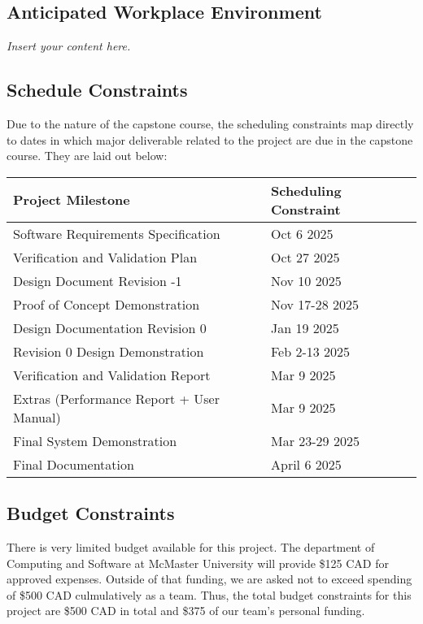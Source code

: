 \documentclass[12pt]{article}
\newcommand{\lips}{\textit{Insert your content here.}}
\begin{document}
\subsection{Anticipated Workplace Environment}
\lips
\subsection{Schedule Constraints}

\par{Due to the nature of the capstone course, the scheduling constraints
map directly to dates in which major deliverable related to the project are due in the capstone course.
They are laid out below:}

\begin{tabular}{|m{5cm}|m{10cm}|}
    \hline
    Project Milestone & Scheduling Constraint\\
    \hline
    Software Requirements Specification & Oct 6 2025\\
    \hline
    Verification and Validation Plan & Oct 27 2025\\
    \hline
    Design Document Revision -1 & Nov 10 2025\\
    \hline
    Proof of Concept Demonstration & Nov 17-28 2025\\
    \hline
    Design Documentation Revision 0 & Jan 19 2025\\
    \hline
    Revision 0 Design Demonstration & Feb 2-13 2025\\
    \hline
    Verification and Validation Report & Mar 9 2025\\
    \hline
    Extras (Performance Report + User Manual) & Mar 9 2025\\
    \hline
    Final System Demonstration & Mar 23-29 2025\\
    \hline
    Final Documentation & April 6 2025\\
    \hline
\end{tabular}




\subsection{Budget Constraints}

\par{There is very limited budget available for this project. The department of Computing and Software at McMaster University 
will provide \$125 CAD for approved expenses. Outside of that funding, we are asked not to exceed spending of \$500 CAD
culmulatively as a team. Thus, the total budget constraints for this project are \$500 CAD in total and \$375 of our team's personal funding.}
\end{document}
